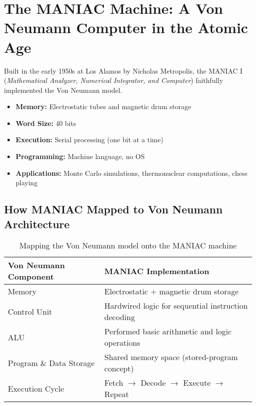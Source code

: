 \section*{The MANIAC Machine: A Von Neumann Computer in the Atomic Age}

Built in the early 1950s at Los Alamos by Nicholas Metropolis, the MANIAC I (\textit{Mathematical Analyzer, Numerical Integrator, and Computer}) faithfully implemented the Von Neumann model.

\begin{tcolorbox}[title=Quick Spec Summary,fonttitle=\bfseries, colback=gray!10]
\begin{itemize}
    \item \textbf{Memory:} Electrostatic tubes and magnetic drum storage
    \item \textbf{Word Size:} 40 bits
    \item \textbf{Execution:} Serial processing (one bit at a time)
    \item \textbf{Programming:} Machine language, no OS
    \item \textbf{Applications:} Monte Carlo simulations, thermonuclear computations, chess playing
\end{itemize}
\end{tcolorbox}

\subsection{How MANIAC Mapped to Von Neumann Architecture}

\begin{table}[h!]
\centering
\begin{tabular}{@{}ll@{}}
\toprule
\textbf{Von Neumann Component} & \textbf{MANIAC Implementation} \\ \midrule
Memory & Electrostatic + magnetic drum storage \\
Control Unit & Hardwired logic for sequential instruction decoding \\
ALU & Performed basic arithmetic and logic operations \\
Program \& Data Storage & Shared memory space (stored-program concept) \\
Execution Cycle & Fetch $\rightarrow$ Decode $\rightarrow$ Execute $\rightarrow$ Repeat \\ \bottomrule
\end{tabular}
\caption{Mapping the Von Neumann model onto the MANIAC machine}
\end{table}

